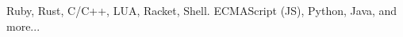 \item[Languages:] Ruby, Rust, C/C++, LUA, Racket, Shell. ECMAScript (JS),
Python, Java, and more...
